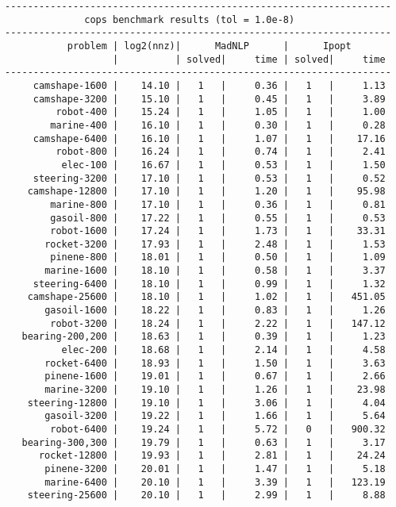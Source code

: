 \begin{verbatim}
--------------------------------------------------------------------
              cops benchmark results (tol = 1.0e-8)
--------------------------------------------------------------------
           problem | log2(nnz)|      MadNLP      |      Ipopt        
                   |          | solved|     time | solved|     time     
--------------------------------------------------------------------
     camshape-1600 |    14.10 |   1   |     0.36 |   1   |     1.13
     camshape-3200 |    15.10 |   1   |     0.45 |   1   |     3.89
         robot-400 |    15.24 |   1   |     1.05 |   1   |     1.00
        marine-400 |    16.10 |   1   |     0.30 |   1   |     0.28
     camshape-6400 |    16.10 |   1   |     1.07 |   1   |    17.16
         robot-800 |    16.24 |   1   |     0.74 |   1   |     2.41
          elec-100 |    16.67 |   1   |     0.53 |   1   |     1.50
     steering-3200 |    17.10 |   1   |     0.53 |   1   |     0.52
    camshape-12800 |    17.10 |   1   |     1.20 |   1   |    95.98
        marine-800 |    17.10 |   1   |     0.36 |   1   |     0.81
        gasoil-800 |    17.22 |   1   |     0.55 |   1   |     0.53
        robot-1600 |    17.24 |   1   |     1.73 |   1   |    33.31
       rocket-3200 |    17.93 |   1   |     2.48 |   1   |     1.53
        pinene-800 |    18.01 |   1   |     0.50 |   1   |     1.09
       marine-1600 |    18.10 |   1   |     0.58 |   1   |     3.37
     steering-6400 |    18.10 |   1   |     0.99 |   1   |     1.32
    camshape-25600 |    18.10 |   1   |     1.02 |   1   |   451.05
       gasoil-1600 |    18.22 |   1   |     0.83 |   1   |     1.26
        robot-3200 |    18.24 |   1   |     2.22 |   1   |   147.12
   bearing-200,200 |    18.63 |   1   |     0.39 |   1   |     1.23
          elec-200 |    18.68 |   1   |     2.14 |   1   |     4.58
       rocket-6400 |    18.93 |   1   |     1.50 |   1   |     3.63
       pinene-1600 |    19.01 |   1   |     0.67 |   1   |     2.66
       marine-3200 |    19.10 |   1   |     1.26 |   1   |    23.98
    steering-12800 |    19.10 |   1   |     3.06 |   1   |     4.04
       gasoil-3200 |    19.22 |   1   |     1.66 |   1   |     5.64
        robot-6400 |    19.24 |   1   |     5.72 |   0   |   900.32
   bearing-300,300 |    19.79 |   1   |     0.63 |   1   |     3.17
      rocket-12800 |    19.93 |   1   |     2.81 |   1   |    24.24
       pinene-3200 |    20.01 |   1   |     1.47 |   1   |     5.18
       marine-6400 |    20.10 |   1   |     3.39 |   1   |   123.19
    steering-25600 |    20.10 |   1   |     2.99 |   1   |     8.88

\end{verbatim}
